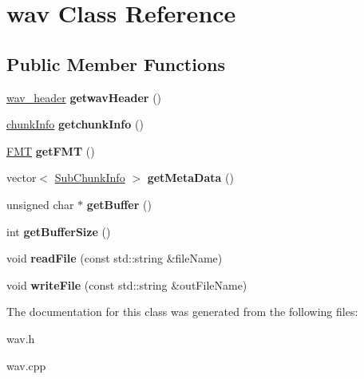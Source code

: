 \hypertarget{classwav}{}\section{wav Class Reference}
\label{classwav}
\subsection*{Public Member Functions}
\begin{DoxyCompactItemize}
\item 
\mbox{\label{classwav_ae516be2aa151116b6efa9bb2259375a2}} 
\hyperlink{structwav__header}{wav\+\_\+header} {\bfseries getwav\+Header} ()
\item 
\mbox{\label{classwav_a78078cac84af7cd47e2708e69981a7ff}} 
\hyperlink{structchunkInfo}{chunk\+Info} {\bfseries getchunk\+Info} ()
\item 
\mbox{\label{classwav_ade97067fdaf896de09a50c2b31a9407a}} 
\hyperlink{structFMT}{F\+MT} {\bfseries get\+F\+MT} ()
\item 
\mbox{\label{classwav_a7206f86afcafa65570a5d8a103e8cb7b}} 
vector$<$ \hyperlink{structSubChunkInfo}{Sub\+Chunk\+Info} $>$ {\bfseries get\+Meta\+Data} ()
\item 
\mbox{\label{classwav_a52434e47a2be975ed9ddbaa419440a57}} 
unsigned char $\ast$ {\bfseries get\+Buffer} ()
\item 
\mbox{\label{classwav_a37eeb0ca9eeb0cbe63b273522b45c3d0}} 
int {\bfseries get\+Buffer\+Size} ()
\item 
\mbox{\label{classwav_ae384424df75458d6952b43e452c5e629}} 
void {\bfseries read\+File} (const std\+::string \&file\+Name)
\item 
\mbox{\label{classwav_ad7acdb298bf7bbd4a815cf79c51c6806}} 
void {\bfseries write\+File} (const std\+::string \&out\+File\+Name)
\end{DoxyCompactItemize}


The documentation for this class was generated from the following files\+:\begin{DoxyCompactItemize}
\item 
wav.\+h\item 
wav.\+cpp\end{DoxyCompactItemize}
